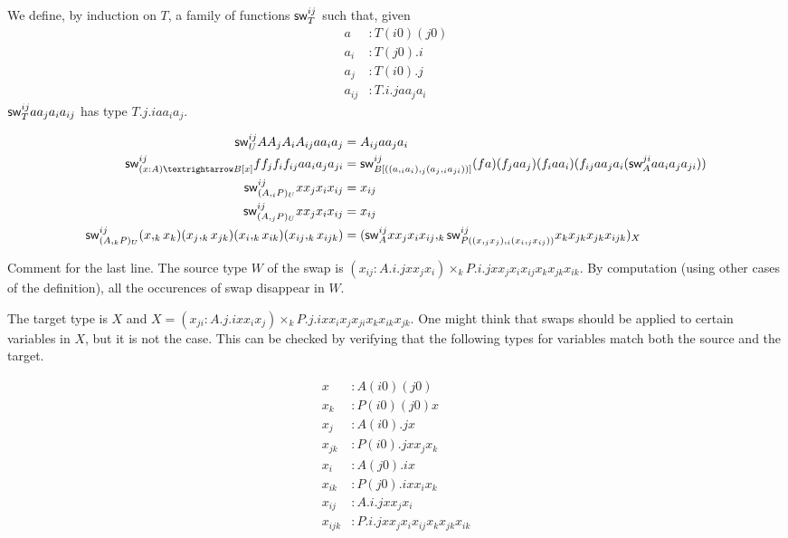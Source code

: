 \documentclass[10pt,a4paper]{article}
\begin{document}
\begin{definition}[$\sw i j T$]
We define, by induction on $T$, a family of functions $\sw i j T$
such that, given 
\begin{align*}
  a &: T (i0) (j0) \\
  a_i &: T (j0).i \\
  a_j &: T (i0).j \\
  a_{ij} &: T.i.j a a_j a_i 
\end{align*}
$\mathsf{sw}^{ij}_{T} a a_j a_i a_{ij}$ has type  $T.j.i a a_i a_j$.

\begin{align*}
  \sw i j {U} A A_j A_i A_{ij} a a_i a_j & = A_{ij} a a_j a_i  \\
  \sw i j {(x:A) → B[x]} f f_j f_i f_{ij} a a_i a_j a_{ji} & = \sw i j {B[((a,_ia_i),_j(a_j,_ia_{ji}))]} (f a)
(f_j a a_j) (f_i a a_i) (f_{ij} a a_j a_i (\sw j i A a a_i a_j a_{ji})) \\
  \sw i j {(A ,_i P)_U} x x_j x_i x_{ij} & = x_{ij} \\
  \sw i j {(A ,_j P)_U} x x_j x_i x_{ij} & = x_{ij} \\
  \sw i j {(A ,_k P)_U} (x ,_k x_k) (x_j ,_k x_{jk}) (x_i ,_k x_{ik}) (x_{ij},_k x_{ijk}) & = 
    (\sw i j A x x_j x_i x_{ij},_k \sw i j {P ((x,_jx_j),_i(x_i,_j x_{ij}))} x_k x_{jk} x_{jk} x_{ijk})_X
\end{align*}
\end{definition}

Comment for the last line. The source type $W$ of the swap is
$(x_{ij}:A.i.j x x_j x_i) \times_k P.i.j x x_j x_i x_{ij} x_k x_{jk}
x_{ik}$. By computation (using other cases of the definition), all the
occurences of swap disappear in $W$.

The target type is $X$ and $X = (x_{ji}:A.j.i x x_i x_j) \times_k
P.j.i x x_i x_j x_{ji} x_k x_{ik} x_{jk}$.  One might think that swaps
should be applied to certain variables in $X$, but it is not
the case.  This can be checked by verifying that the following types
for variables match both the source and the target.

\begin{align*}
 x &: A(i0)(j0) \\
 x_k &: P(i0)(j0) x \\
 x_j &: A(i0).j x \\
 x_{jk} &: P(i0).j x x_j x_k \\
 x_i &: A(j0).i x \\
 x_{ik} &: P(j0).i x x_i x_k \\
 x_{ij} &: A.i.j x x_j x_i \\
 x_{ijk} &: P.i.j x x_j x_i x_{ij} x_k x_{jk} x_{ik}
\end{align*}
\end{document}
